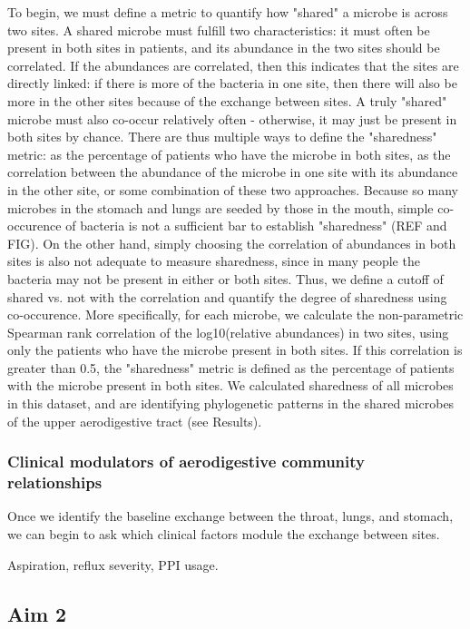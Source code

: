 \documentclass[12pt]{article}
\begin{document}
To begin, we must define a metric to quantify how "shared" a microbe is across two sites. A shared microbe must fulfill two characteristics: it must often be present in both sites in patients, and its abundance in the two sites should be correlated. If the abundances are correlated, then this indicates that the sites are directly linked: if there is more of the bacteria in one site, then there will also be more in the other sites because of the exchange between sites. A truly "shared" microbe must also co-occur relatively often - otherwise, it may just be present in both sites by chance. There are thus multiple ways to define the "sharedness" metric: as the percentage of patients who have the microbe in both sites, as the correlation between the abundance of the microbe in one site with its abundance in the other site, or some combination of these two approaches. Because so many microbes in the stomach and lungs are seeded by those in the mouth, simple co-occurence of bacteria is not a sufficient bar to establish "sharedness" (REF and FIG). On the other hand, simply choosing the correlation of abundances in both sites is also not adequate to measure sharedness, since in many people the bacteria may not be present in either or both sites. Thus, we define a cutoff of shared vs. not with the correlation and quantify the degree of sharedness using co-occurence. More specifically, for each microbe, we calculate the non-parametric Spearman rank correlation of the log10(relative abundances) in two sites, using only the patients who have the microbe present in both sites. If this correlation is greater than 0.5, the "sharedness" metric is defined as the percentage of patients with the microbe present in both sites. We calculated sharedness of all microbes in this dataset, and are identifying phylogenetic patterns in the shared microbes of the upper aerodigestive tract (see Results).

\subsubsection{Clinical modulators of aerodigestive community relationships}
Once we identify the baseline exchange between the throat, lungs, and stomach, we can begin to ask which clinical factors module the exchange between sites.

Aspiration, reflux severity, PPI usage.


\subsection*{Aim 2}
\end{document}
